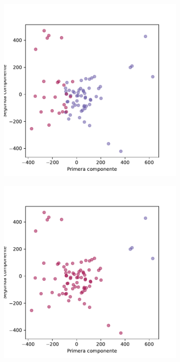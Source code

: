 \begin{figure}[p]
\begin{subfigure}{0.45\textwidth}
    \caption{}
    \label{fig:treat-true}
  \end{subfigure}
  \begin{subfigure}{0.45\textwidth}
    \centering
    \includegraphics[width=\textwidth]{figures/kmeans_asg-all-sessions-trayectory.pdf}
    \caption{}
    \label{fig:treat-kmean}
  \end{subfigure}
  \begin{subfigure}{0.45\textwidth}
    \centering
    \includegraphics[width=\textwidth]{figures/agg_asg-all-sessions-trayectory.pdf}

\end{subfigure}
\end{figure}
